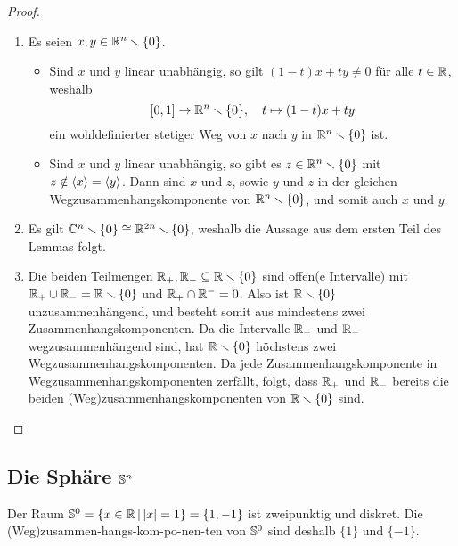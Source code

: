 \begin{proof}
  \begin{enumerate}[label = \alph*)]
    \item
      Es seien $x, y \in \mathbb{R}^n \smallsetminus \{0\}$.
      \begin{itemize}
        \item
          Sind $x$ und $y$ linear unabhängig, so gilt $(1-t) x + t y \neq 0$ für alle $t \in \mathbb{R}$, weshalb
          \[
                    [0,1]
            \to     \mathbb{R}^n \smallsetminus \{0\},
            \quad   t
            \mapsto (1-t) x + t y
          \]
          ein wohldefinierter stetiger Weg von $x$ nach $y$ in $\mathbb{R}^n \smallsetminus \{0\}$ ist.
        \item
          Sind $x$ und $y$ linear unabhängig, so gibt es $z \in \mathbb{R}^n \smallsetminus \{0\}$ mit $z \notin \left\langle x \right\rangle = \left\langle y \right\rangle$.
          Dann sind $x$ und $z$, sowie $y$ und $z$ in der gleichen Wegzusammenhangskomponente von $\mathbb{R}^n \smallsetminus \{0\}$, und somit auch $x$ und $y$.
      \end{itemize}
      
    \item
      Es gilt $\mathbb{C}^n \smallsetminus \{0\} \cong \mathbb{R}^{2n} \smallsetminus \{0\}$, weshalb die Aussage aus dem ersten Teil des Lemmas folgt.
      
    \item
      Die beiden Teilmengen $\mathbb{R}_+, \mathbb{R}_- \subseteq \mathbb{R} \smallsetminus \{0\}$ sind offen(e Intervalle) mit $\mathbb{R}_+ \cup \mathbb{R}_- = \mathbb{R} \smallsetminus \{0\}$ und $\mathbb{R}_+ \cap \mathbb{R}^- = 0$.
      Also ist $\mathbb{R} \smallsetminus \{0\}$ unzusammenhängend, und besteht somit aus mindestens zwei Zusammenhangskomponenten.
      Da die Intervalle $\mathbb{R}_+$ und $\mathbb{R}_-$ wegzusammenhängend sind, hat $\mathbb{R} \smallsetminus \{0\}$ höchstens zwei Wegzusammenhangskomponenten.
      Da jede Zusammenhangskomponente in Wegzusammenhangskomponenten zerfällt, folgt, dass $\mathbb{R}_+$ und $\mathbb{R}_-$ bereits die beiden (Weg)zusammenhangskomponenten von $\mathbb{R} \smallsetminus \{0\}$ sind.
    \qedhere
  \end{enumerate}
\end{proof}





\subsection{Die Sphäre \texorpdfstring{$\mathbb{S}^n$}{Sn}}

Der Raum $\mathbb{S}^0 = \{x \in \mathbb{R} \,|\, |x| = 1\} = \{1, -1\}$ ist zweipunktig und diskret.
Die (Weg)zusammen-hangs-kom-po-nen-ten von $\mathbb{S}^0$ sind deshalb $\{1\}$ und $\{-1\}$.

